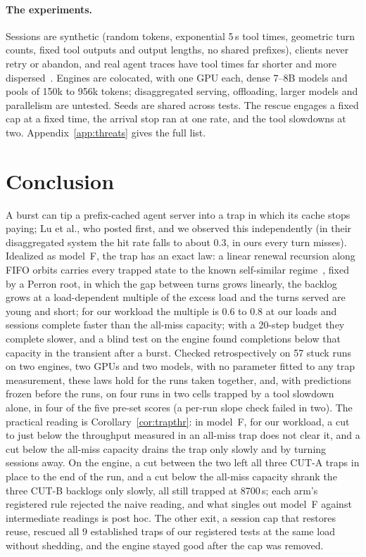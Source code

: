 \paragraph{The experiments.} Sessions are synthetic (random tokens, exponential 5\,s tool times, geometric turn counts, fixed tool
outputs and output lengths, no shared prefixes), clients never retry or abandon, and real agent traces have tool times far shorter
and more dispersed~\citep{zhu2026tracelab}. Engines are colocated, with one GPU each, dense 7--8B models and pools of 150k to 956k tokens; disaggregated
serving, offloading, larger models and parallelism are untested. Seeds are shared across tests. The rescue engages a fixed cap at a
fixed time, the arrival stop ran at one rate, and the tool slowdowns at two. Appendix~\ref{app:threats} gives the full list.

\section{Conclusion}\label{sec:conclusion}

A burst can tip a prefix-cached agent server into a trap in which its cache stops paying; Lu et al., who posted first, and we
observed this independently (in their disaggregated system the hit rate falls to about 0.3, in ours every turn misses). Idealized as
model~F, the trap has an exact law: a linear renewal recursion along FIFO orbits carries every trapped state to the known
self-similar regime~\citep{khanin2001steady}, fixed by a Perron root, in which the gap between turns grows linearly, the backlog grows
at a load-dependent multiple of the excess load and the turns served are young and short; for our workload the multiple is 0.6 to 0.8 at our loads
and sessions complete faster than the all-miss capacity; with a 20-step budget they complete slower, and a blind test on the engine found completions below that capacity in the transient after a burst. Checked
retrospectively on 57 stuck runs on two engines, two GPUs and two models, with no parameter fitted to any trap measurement, these laws
hold for the runs taken together, and, with predictions frozen before the runs, on four runs in two cells trapped by a tool slowdown
alone, in four of the five pre-set scores (a per-run slope check failed in two). The practical reading is
Corollary~\ref{cor:trapthr}: in model~F, for our workload, a cut to just below the throughput measured in an all-miss trap does not clear it, and a cut
below the all-miss capacity drains the trap only slowly and by turning sessions away. On the engine, a cut between the two left all three CUT-A traps in place
to the end of the run, and a cut below the all-miss capacity shrank the three CUT-B backlogs only slowly, all still trapped at 8700\,s; each arm's registered rule rejected the naive reading, and what singles out
model~F against intermediate readings is post hoc. The other exit, a session cap that restores reuse, rescued all 9 established traps
of our registered tests at the same load without shedding, and the engine stayed good after the cap was removed.

